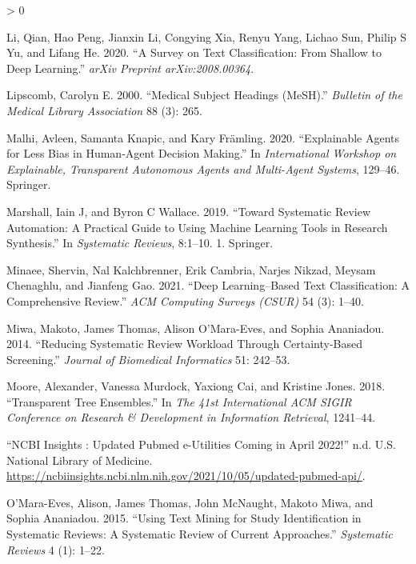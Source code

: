 \documentclass{article}
\newlength{\cslhangindent}
\newenvironment{CSLReferences}[2] %
 {%
  \setlength{\parindent}{0pt}
  \ifodd #1 \everypar{\setlength{\hangindent}{\cslhangindent}}\ignorespaces\fi
  \ifnum #2 > 0
  \setlength{\parskip}{#2\baselineskip}
  \fi
 }%
 {}
\begin{document}
\begin{CSLReferences}{1}{0}
\leavevmode\hypertarget{ref-li2020survey}{}%
Li, Qian, Hao Peng, Jianxin Li, Congying Xia, Renyu Yang, Lichao Sun,
Philip S Yu, and Lifang He. 2020. {``A Survey on Text Classification:
From Shallow to Deep Learning.''} \emph{arXiv Preprint
arXiv:2008.00364}.

\leavevmode\hypertarget{ref-lipscomb2000medical}{}%
Lipscomb, Carolyn E. 2000. {``Medical Subject Headings (MeSH).''}
\emph{Bulletin of the Medical Library Association} 88 (3): 265.

\leavevmode\hypertarget{ref-malhi2020explainable}{}%
Malhi, Avleen, Samanta Knapic, and Kary Främling. 2020. {``Explainable
Agents for Less Bias in Human-Agent Decision Making.''} In
\emph{International Workshop on Explainable, Transparent Autonomous
Agents and Multi-Agent Systems}, 129--46. Springer.

\leavevmode\hypertarget{ref-marshall2015systematic}{}%
Marshall, Iain J, and Byron C Wallace. 2019. {``Toward Systematic Review
Automation: A Practical Guide to Using Machine Learning Tools in
Research Synthesis.''} In \emph{Systematic Reviews}, 8:1--10. 1.
Springer.

\leavevmode\hypertarget{ref-minaee2021deep}{}%
Minaee, Shervin, Nal Kalchbrenner, Erik Cambria, Narjes Nikzad, Meysam
Chenaghlu, and Jianfeng Gao. 2021. {``Deep Learning--Based Text
Classification: A Comprehensive Review.''} \emph{ACM Computing Surveys
(CSUR)} 54 (3): 1--40.

\leavevmode\hypertarget{ref-miwa2014reducing}{}%
Miwa, Makoto, James Thomas, Alison O'Mara-Eves, and Sophia Ananiadou.
2014. {``Reducing Systematic Review Workload Through Certainty-Based
Screening.''} \emph{Journal of Biomedical Informatics} 51: 242--53.

\leavevmode\hypertarget{ref-moore2018transparent}{}%
Moore, Alexander, Vanessa Murdock, Yaxiong Cai, and Kristine Jones.
2018. {``Transparent Tree Ensembles.''} In \emph{The 41st International
ACM SIGIR Conference on Research \& Development in Information
Retrieval}, 1241--44.

\leavevmode\hypertarget{ref-pubmedUpdate}{}%
{``NCBI Insights : Updated Pubmed e-Utilities Coming in April 2022!''}
n.d. U.S. National Library of Medicine.
\url{https://ncbiinsights.ncbi.nlm.nih.gov/2021/10/05/updated-pubmed-api/}.

\leavevmode\hypertarget{ref-o2015using}{}%
O'Mara-Eves, Alison, James Thomas, John McNaught, Makoto Miwa, and
Sophia Ananiadou. 2015. {``Using Text Mining for Study Identification in
Systematic Reviews: A Systematic Review of Current Approaches.''}
\emph{Systematic Reviews} 4 (1): 1--22.


\end{CSLReferences}
\end{document}

